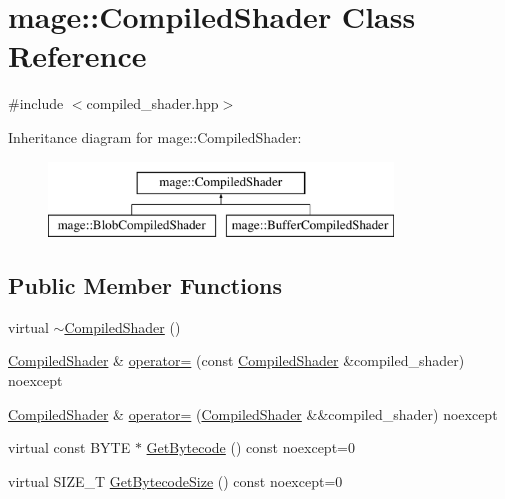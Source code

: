 \hypertarget{classmage_1_1_compiled_shader}{}\section{mage\+:\+:Compiled\+Shader Class Reference}
\label{classmage_1_1_compiled_shader}


{\ttfamily \#include $<$compiled\+\_\+shader.\+hpp$>$}

Inheritance diagram for mage\+:\+:Compiled\+Shader\+:\begin{figure}[H]
\begin{center}
\leavevmode
\includegraphics[height=2.000000cm]{classmage_1_1_compiled_shader}
\end{center}
\end{figure}
\subsection*{Public Member Functions}
\begin{DoxyCompactItemize}
\item 
virtual \hyperlink{classmage_1_1_compiled_shader_a40805ed2bcd988824d130aeb07200f21}{$\sim$\+Compiled\+Shader} ()
\item 
\hyperlink{classmage_1_1_compiled_shader}{Compiled\+Shader} \& \hyperlink{classmage_1_1_compiled_shader_aeb91e4d48420341f83646a6203fe138d}{operator=} (const \hyperlink{classmage_1_1_compiled_shader}{Compiled\+Shader} \&compiled\+\_\+shader) noexcept
\item 
\hyperlink{classmage_1_1_compiled_shader}{Compiled\+Shader} \& \hyperlink{classmage_1_1_compiled_shader_abfa97b056d6e9f0f475c8b231c4cab96}{operator=} (\hyperlink{classmage_1_1_compiled_shader}{Compiled\+Shader} \&\&compiled\+\_\+shader) noexcept
\item 
virtual const B\+Y\+TE $\ast$ \hyperlink{classmage_1_1_compiled_shader_a3d7a58d568dc30e66ea7488f28911127}{Get\+Bytecode} () const noexcept=0
\item 
virtual S\+I\+Z\+E\+\_\+T \hyperlink{classmage_1_1_compiled_shader_ae9dbc3c205d54cc89b9b0746b76b157b}{Get\+Bytecode\+Size} () const noexcept=0
\end{DoxyCompactItemize}
